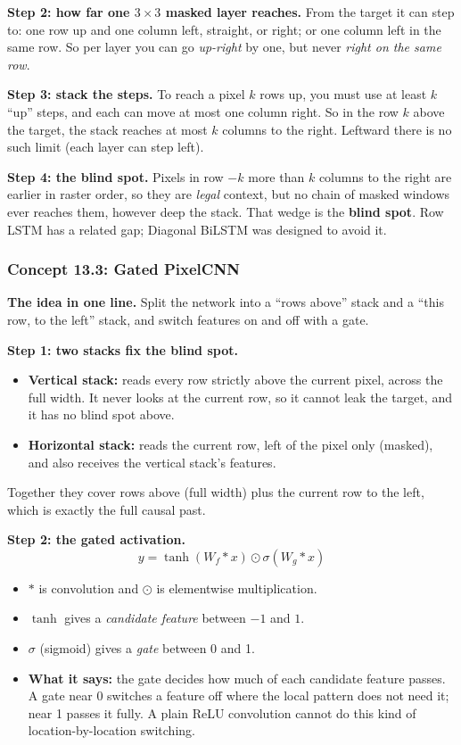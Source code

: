 \documentclass[12pt,a4paper]{article}
\begin{document}
\textbf{Step 2: how far one $3\times3$ masked layer reaches.} From the target it can step to: one row up and one column left, straight, or right; or one column left in the same row. So per layer you can go \emph{up-right} by one, but never \emph{right on the same row}.

\textbf{Step 3: stack the steps.} To reach a pixel $k$ rows up, you must use at least $k$ ``up'' steps, and each can move at most one column right. So in the row $k$ above the target, the stack reaches at most $k$ columns to the right. Leftward there is no such limit (each layer can step left).

\textbf{Step 4: the blind spot.} Pixels in row $-k$ more than $k$ columns to the right are earlier in raster order, so they are \emph{legal} context, but no chain of masked windows ever reaches them, however deep the stack. That wedge is the \textbf{blind spot}. Row LSTM has a related gap; Diagonal BiLSTM was designed to avoid it.

\subsubsection{Concept 13.3: Gated PixelCNN}\label{c13-3}

\textbf{The idea in one line.} Split the network into a ``rows above'' stack and a ``this row, to the left'' stack, and switch features on and off with a gate.

\textbf{Step 1: two stacks fix the blind spot.}
\begin{itemize}[nosep]
  \item \textbf{Vertical stack:} reads every row strictly above the current pixel, across the full width. It never looks at the current row, so it cannot leak the target, and it has no blind spot above.
  \item \textbf{Horizontal stack:} reads the current row, left of the pixel only (masked), and also receives the vertical stack's features.
\end{itemize}
Together they cover rows above (full width) plus the current row to the left, which is exactly the full causal past.

\textbf{Step 2: the gated activation.}
\[
y=\tanh(W_f*x)\odot\sigma(W_g*x)
\]
\begin{itemize}[nosep]
  \item $*$ is convolution and $\odot$ is elementwise multiplication.
  \item $\tanh$ gives a \emph{candidate feature} between $-1$ and $1$.
  \item $\sigma$ (sigmoid) gives a \emph{gate} between 0 and 1.
  \item \textbf{What it says:} the gate decides how much of each candidate feature passes. A gate near 0 switches a feature off where the local pattern does not need it; near 1 passes it fully. A plain ReLU convolution cannot do this kind of location-by-location switching.
\end{itemize}
\end{document}
